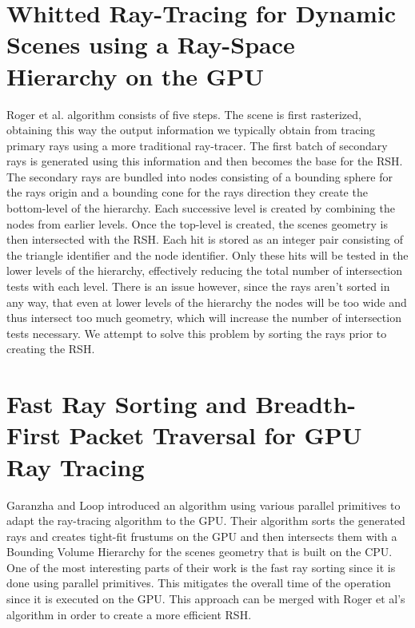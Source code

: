 \section{Whitted Ray-Tracing for Dynamic Scenes using a Ray-Space Hierarchy on the GPU}
\label{section:backgroud_roger07}

Roger et al. \cite{Roger07} algorithm consists of five steps. The scene is first rasterized, obtaining this way the output information we typically obtain from tracing primary rays using a more traditional ray-tracer. The first batch of secondary rays is generated using this information and then becomes the base for the RSH. The secondary rays are bundled into nodes consisting of a bounding sphere for the rays origin and a bounding cone for the rays direction they create the bottom-level of the hierarchy. Each successive level is created by combining the nodes from earlier levels. Once the top-level is created, the scenes geometry is then intersected with the RSH. Each hit is stored as an integer pair consisting of the triangle identifier and the node identifier. Only these hits will be tested in the lower levels of the hierarchy, effectively reducing the total number of intersection tests with each level. There is an issue however, since the rays aren't sorted in any way, that even at lower levels of the hierarchy the nodes will be too wide and thus intersect too much geometry, which will increase the number of intersection tests necessary. We attempt to solve this problem by sorting the rays prior to creating the RSH.

\section{Fast Ray Sorting and Breadth-First Packet Traversal for GPU Ray Tracing}
\label{section:backgroud_garanzha10}

Garanzha and Loop \cite{Garanzha10} introduced an algorithm using various parallel primitives to adapt the ray-tracing algorithm to the GPU. Their algorithm sorts the generated rays and creates tight-fit frustums on the GPU and then intersects them with a Bounding Volume Hierarchy for the scenes geometry that is built on the CPU. One of the most interesting parts of their work is the fast ray sorting since it is done using parallel primitives. This mitigates the overall time of the operation since it is executed on the GPU. This approach can be merged with Roger et al's \cite{Roger07} algorithm in order to create a more efficient RSH.